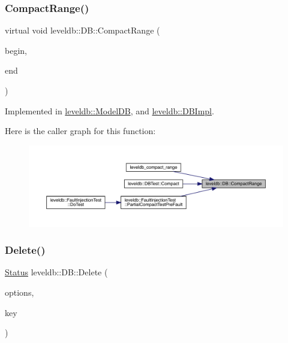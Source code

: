 \subsubsection{\texorpdfstring{CompactRange()}{CompactRange()}}
{\footnotesize\ttfamily virtual void leveldb\+::\+D\+B\+::\+Compact\+Range (\begin{DoxyParamCaption}\item[{const \mbox{\hyperlink{classleveldb_1_1_slice}{Slice}} $\ast$}]{begin,  }\item[{const \mbox{\hyperlink{classleveldb_1_1_slice}{Slice}} $\ast$}]{end }\end{DoxyParamCaption})\hspace{0.3cm}{\ttfamily [pure virtual]}}



Implemented in \mbox{\hyperlink{classleveldb_1_1_model_d_b_a7a04a6e5227079f861c26b920df6b833}{leveldb\+::\+Model\+DB}}, and \mbox{\hyperlink{classleveldb_1_1_d_b_impl_aa6df0739fc0b49380c284347e411b8ed}{leveldb\+::\+D\+B\+Impl}}.

Here is the caller graph for this function\+:
\nopagebreak
\begin{figure}[H]
\begin{center}
\leavevmode
\includegraphics[width=350pt]{classleveldb_1_1_d_b_aeea500cbc6704454b3be6908d5da8b3a_icgraph}
\end{center}
\end{figure}
\mbox{\label{classleveldb_1_1_d_b_aff7577239799cd059464701c548090b9}} 
\subsubsection{\texorpdfstring{Delete()}{Delete()}}
{\footnotesize\ttfamily \mbox{\hyperlink{classleveldb_1_1_status}{Status}} leveldb\+::\+D\+B\+::\+Delete (\begin{DoxyParamCaption}\item[{const \mbox{\hyperlink{structleveldb_1_1_write_options}{Write\+Options}} \&}]{options,  }\item[{const \mbox{\hyperlink{classleveldb_1_1_slice}{Slice}} \&}]{key }\end{DoxyParamCaption})\hspace{0.3cm}{\ttfamily [pure virtual]}}



